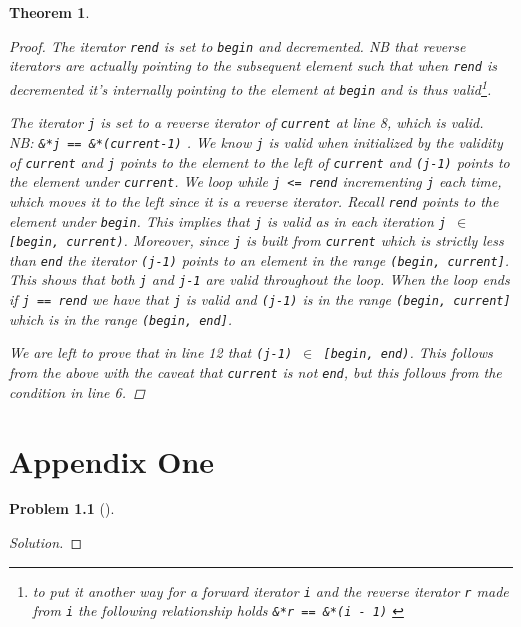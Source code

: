 \documentclass[oneside]{book}
\theoremstyle{definition}
\newtheorem{problem}{Problem}[section]
\theoremstyle{plain}
\newtheorem{thm}{Theorem}[chapter]
\begin{document}
\begin{spacing}{1.618}
\begin{thm}
\begin{proof}
		The iterator \texttt{rend} is set to \texttt{begin} and decremented. NB that reverse iterators are actually pointing to the subsequent element such that when \texttt{rend} is decremented it's internally pointing to the element at \texttt{begin} and is thus valid\footnote{to put it another way for a forward iterator \texttt{i} and the reverse iterator \texttt{r} made from \texttt{i} the following relationship holds \texttt{\&*r == \&*(i - 1)} \cite{reverse_iterator} }. 
		
		The iterator \texttt{j} is set to a reverse iterator of \texttt{current} at line 8, which is valid. NB: \texttt{\&*j == \&*(current-1)} \cite{reverse_iterator}. We know \texttt{j} is valid when initialized by the validity of \texttt{current} and \texttt{j} points to the element to the left of \texttt{current} and \texttt{(j-1)} points to the element under \texttt{current}. We loop while \texttt{j <= rend} incrementing \texttt{j} each time, which moves it to the left since it is a reverse iterator. Recall \texttt{rend} points to the element under \texttt{begin}. This implies that \texttt{j} is valid as in each iteration \texttt{j $\in$ [begin, current)}. Moreover, since \texttt{j} is built from \texttt{current} which is strictly less than \texttt{end} the iterator \texttt{(j-1)} points to an element in the range \texttt{(begin, current]}. This shows that both \texttt{j} and \texttt{j-1} are valid throughout the loop. When the loop ends if \texttt{j == rend} we have that \texttt{j} is valid and \texttt{(j-1)} is in the range \texttt{(begin, current]} which is in the range \texttt{(begin, end]}.  
		
		We are left to prove that in line 12 that \texttt{(j-1) $\in$ [begin, end)}. This follows from the above with the caveat that \texttt{current} is not \texttt{end}, but this follows from the condition in line 6. 
	\end{proof}
\end{thm}



\appendix
\chapter{Appendix One}

\begin{problem}[]
	\begin{proof}[Solution]

	\end{proof}
\end{problem}

\end{spacing}
\backmatter

\printglossary[type=\acronymtype]
\clearpage

\printglossary
\clearpage

\printbibliography
\clearpage

\printindex
%
\end{document}
